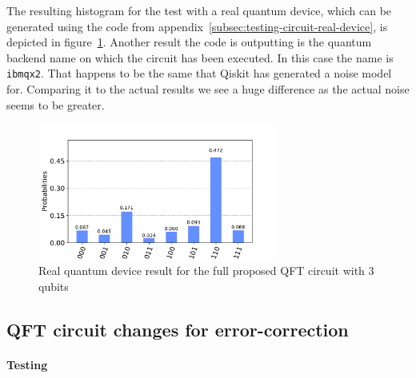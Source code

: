 The resulting histogram for the test with a real quantum device, which can be generated using the code from appendix~\ref{subsec:testing-circuit-real-device}, is depicted in figure~\ref{fig:test-histogram-real-device}.
Another result the code is outputting is the quantum backend name on which the circuit has been executed.
In this case the name is \texttt{ibmqx2}.
That happens to be the same that Qiskit has generated a noise model for.
Comparing it to the actual results we see a huge difference as the actual noise seems to be greater.

\begin{figure}[H]
    \centering
    \includegraphics[width=0.7\textwidth]{res/test-histogram-real-quantum-device.pdf}
    \caption{Real quantum device result for the full proposed QFT circuit with 3 qubits}
    \label{fig:test-histogram-real-device}
\end{figure}

\subsection{QFT circuit changes for error-correction}
\label{subsec:qft-circuit-error-correction}



\paragraph{Testing}

